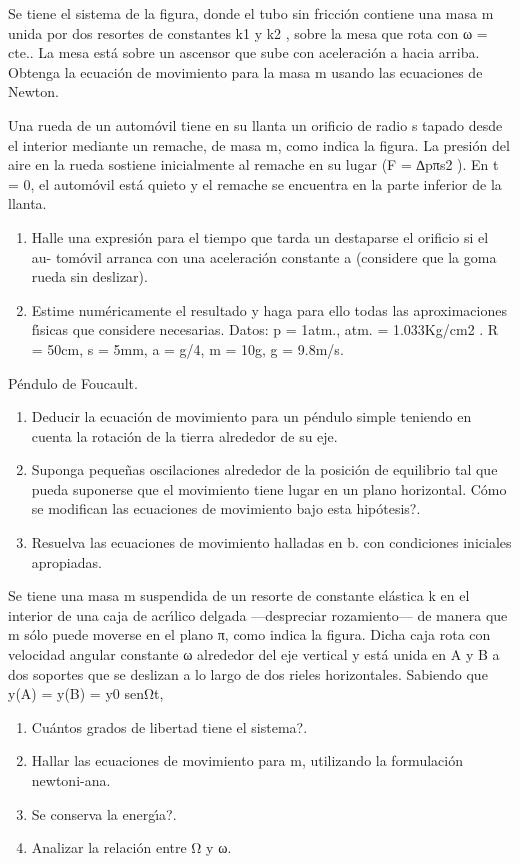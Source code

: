 \documentclass[10pt,oneside]{CBFT_book}
\begin{document}
\begin{ejercicios}
\label{ej5}
\item{ \bf }
Se tiene el sistema de la figura, donde el tubo sin fricción contiene una masa m unida
por dos resortes de constantes k1 y k2 , sobre la mesa que rota con ω = cte.. La mesa
está sobre un ascensor que sube con aceleración a hacia arriba. Obtenga la ecuación
de movimiento para la masa m usando las ecuaciones de Newton.

\label{ej6}
\item{ \bf }
Una rueda de un automóvil tiene en su llanta un orificio de radio s tapado desde el
interior mediante un remache, de masa m, como indica la figura. La presión del aire
en la rueda sostiene inicialmente al remache en su lugar (F = ∆pπs2 ). En t = 0, el
automóvil está quieto y el remache se encuentra en la parte inferior de la llanta.
\begin{enumerate}[label=(\alph*)]
\item Halle una expresión para el tiempo que tarda un destaparse el orificio si el au-
tomóvil arranca con una aceleración constante a (considere que la goma rueda
sin deslizar).
\item Estime numéricamente el resultado y haga para ello todas las aproximaciones
fı́sicas que considere necesarias. Datos: p = 1atm., atm. = 1.033Kg/cm2 . R =
50cm, s = 5mm, a = g/4, m = 10g, g = 9.8m/s.
\end{enumerate}

\label{ej7}
\item{ \bf }
Péndulo de Foucault.
\begin{enumerate}[label=(\alph*)]
\item Deducir la ecuación de movimiento para un péndulo simple teniendo en cuenta
la rotación de la tierra alrededor de su eje.
\item Suponga pequeñas oscilaciones alrededor de la posición de equilibrio tal que
pueda suponerse que el movimiento tiene lugar en un plano horizontal. Cómo se
modifican las ecuaciones de movimiento bajo esta hipótesis?.
\item Resuelva las ecuaciones de movimiento halladas en b. con condiciones iniciales
apropiadas.
\end{enumerate}

\label{ej8}
\item{ \bf }
Se tiene una masa m suspendida de un resorte de constante elástica k en el interior de
una caja de acrı́lico delgada —despreciar rozamiento— de manera que m sólo puede
moverse en el plano π, como indica la figura. Dicha caja rota con velocidad angular
constante ω alrededor del eje vertical y está unida en A y B a dos soportes que se
deslizan a lo largo de dos rieles horizontales. Sabiendo que y(A) = y(B) = y0 senΩt,
\begin{enumerate}[label=(\alph*)]
\item Cuántos grados de libertad tiene el sistema?.
\item Hallar las ecuaciones de movimiento para m, utilizando la formulación newtoni-ana.
\item Se conserva la energı́a?.
\item Analizar la relación entre Ω y ω.
\end{enumerate}


\end{ejercicios}
\end{document}

